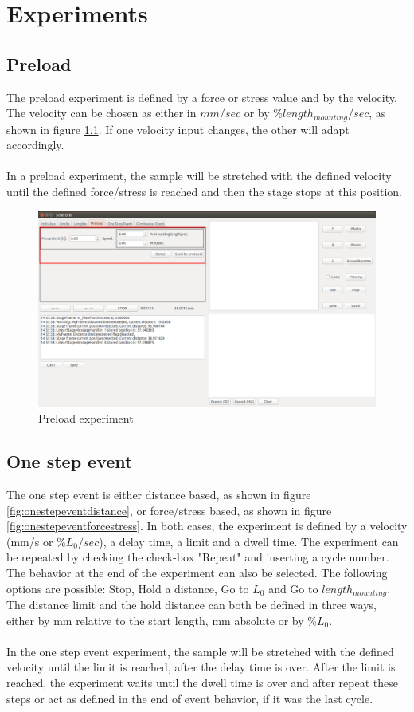 \chapter{Experiments}

\section{Preload}
The preload experiment is defined by a force or stress value and by the velocity. The velocity can be chosen as either in \(mm/sec\) or by \(\% length_{mounting}/sec\), as shown in figure \ref{fig:preload}. If one velocity input changes, the other will adapt accordingly.
\\
\\
In a preload experiment, the sample will be stretched with the defined velocity until the defined force/stress is reached and then the stage stops at this position.

\begin{figure}[!ht]
	\centering
		\includegraphics[width=1.0\textwidth]{images/Preload}
	\caption{Preload experiment}
	\label{fig:preload}
\end{figure}

\section{One step event}
The one step event is either distance based, as shown in figure \ref{fig:onestepeventdistance}, or force/stress based, as shown in figure \ref{fig:onestepeventforcestress}. In both cases, the experiment is defined by a velocity (mm/s or \(\%L_{0}/sec\)), a delay time, a limit and a dwell time. The experiment can be repeated by checking the check-box "Repeat" and inserting a cycle number. The behavior at the end of the experiment can also be selected. The following options are possible: Stop, Hold a distance, Go to \(L_{0}\) and Go to \(length_{mounting}\). The distance limit and the hold distance can both be defined in three ways, either by mm relative to the start length, mm absolute or by \(\%L_{0}\).
\\
\\
In the one step event experiment, the sample will be stretched with the defined velocity until the limit is reached, after the delay time is over. After the limit is reached, the experiment waits until the dwell time is over and after repeat these steps or act as defined in the end of event behavior, if it was the last cycle.

